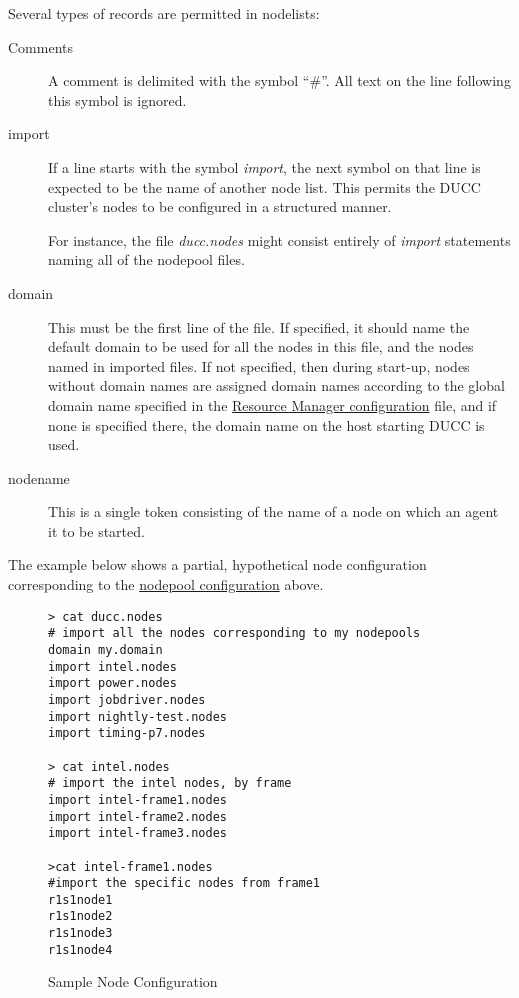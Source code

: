     Several types of records are permitted in nodelists:
    \begin{description}

      \item[Comments] A comment is delimited with the symbol ``$\#$''.  All text on the line
        following this symbol is ignored.

      \item[import] If a line starts with the symbol {\em import}, the next symbol on that line
        is expected to be the name of another node list.  This permits the DUCC cluster's
        nodes to be configured in a structured manner.

        For instance, the file {\em ducc.nodes} might consist entirely of {\em import} statements
        naming all of the nodepool files.
      \item[domain] This must be the first line of the file.  If specified, it should name
        the default domain to be used for all the nodes in this file, and the nodes named
        in imported files.  If not specified, then during start-up, nodes without domain names are assigned
        domain names according to the global domain name specified in the \hyperref[subsubsec:nodepool.configuration]{Resource Manager configuration}
        file, and if none is specified there, the domain name on the host starting DUCC is used.

      \item[nodename] This is a single token consisting of the name of a node on which an
        agent it to be started.

    \end{description}

    The example below shows a partial, hypothetical node configuration corresponding to the
    \hyperref[fig:nodepool.configuration]{nodepool configuration} above.

    \begin{figure}[H]

\begin{verbatim}
> cat ducc.nodes
# import all the nodes corresponding to my nodepools 
domain my.domain
import intel.nodes
import power.nodes
import jobdriver.nodes
import nightly-test.nodes
import timing-p7.nodes

> cat intel.nodes
# import the intel nodes, by frame
import intel-frame1.nodes
import intel-frame2.nodes
import intel-frame3.nodes

>cat intel-frame1.nodes
#import the specific nodes from frame1
r1s1node1
r1s1node2
r1s1node3
r1s1node4
\end{verbatim}
      \caption{Sample Node Configuration}
      \label{fig:node.configuration}

    \end{figure}    
    
